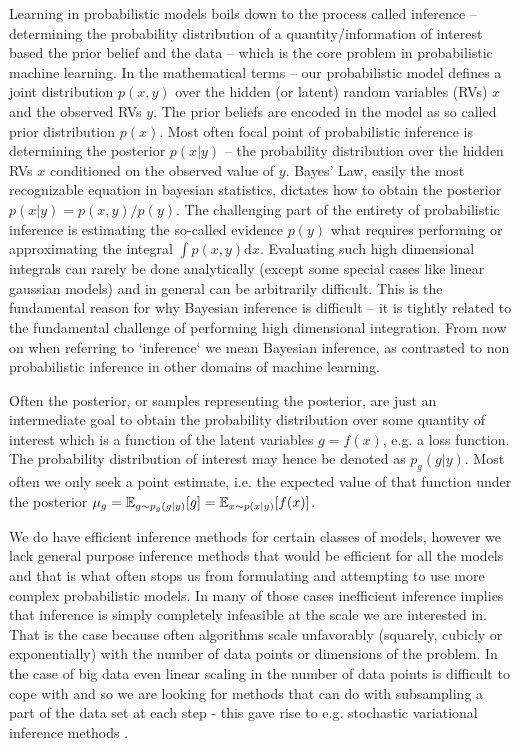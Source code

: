 \documentclass[12pt]{article}
\begin{document}
Learning in probabilistic models boils down to the process called inference -- determining the probability distribution of a quantity/information of interest based the prior belief and the data -- which is the core problem in probabilistic machine learning.
In the mathematical terms -- our probabilistic model defines a joint distribution $p(x,y)$ over the hidden (or latent) random variables (RVs) $x$ and the observed RVs $y$.
The prior beliefs are encoded in the model as so called prior distribution $p(x)$.
Most often focal point of probabilistic inference is determining the posterior $p(x|y)$ -- the probability distribution over the hidden RVs $x$ conditioned on the observed value of $y$.
Bayes' Law, easily the most recognizable equation in bayesian statistics, dictates how to obtain the posterior $p(x|y) = p(x,y)/p(y)$.
The challenging part of the entirety of probabilistic inference is estimating the so-called evidence $p(y)$ what requires performing or approximating the integral $\int p(x,y) \text{d}x$.
Evaluating such high dimensional integrals can rarely be done analytically (except some special cases like linear gaussian models) and in general can be arbitrarily difficult.
This is the fundamental reason for why Bayesian inference is difficult -- it is tightly related to the fundamental challenge of performing high dimensional integration. 
From now on when referring to `inference` we mean Bayesian inference, as contrasted to non probabilistic inference in other domains of machine learning.

Often the posterior, or samples representing the posterior, are just an intermediate goal to
obtain the probability distribution over some quantity of interest which is a function of the latent variables $g=f(x)$, e.g. a loss function.
The probability distribution of interest may hence be denoted as $p_g(g|y)$.
Most often we only seek a point estimate, i.e. the expected value of that function under the posterior $\mu_g=\mathbb{E}_{g \sim p_g(g|y)}[g]=\mathbb{E}_{x \sim p(x|y)}[f(x)]$.

We do have efficient inference methods for certain classes of models, however we lack general purpose inference methods that would be efficient for all the models and that is what often stops us from formulating and attempting to use more complex probabilistic 
models.
In many of those cases inefficient inference implies that inference is simply completely infeasible at the scale we are interested in.
That is the case because often algorithms scale unfavorably (squarely, cubicly or exponentially) with the number of data points or dimensions of the problem.
In the case of big data even linear scaling in the number of data points is difficult to cope with and so we are looking for methods that can do with subsampling a part of the data set at each step - this gave rise to e.g. stochastic variational inference methods \citep{HoffmanEtAl2013}. 
\end{document}
